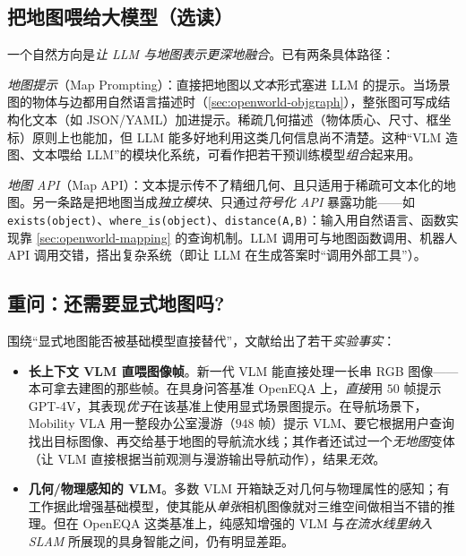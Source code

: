 \subsection{把地图喂给大模型（选读）}
\label{sec:openworld-mapapi}

一个自然方向是\emph{让 LLM 与地图表示更深地融合}\cite{paull2026openworld}。已有两条具体路径：

\emph{地图提示}（Map Prompting）：直接把地图以\emph{文本}形式塞进 LLM 的提示。当场景图的物体与边都用自然语言描述时（\cref{sec:openworld-objgraph}），整张图可写成结构化文本（如 JSON/YAML）加进提示。稀疏几何描述（物体质心、尺寸、框坐标）原则上也能加，但 LLM 能多好地利用这类几何信息尚不清楚。这种“VLM 造图、文本喂给 LLM”的模块化系统，可看作把若干预训练模型\emph{组合}起来用。

\emph{地图 API}（Map API）：文本提示传不了精细几何、且只适用于稀疏可文本化的地图。另一条路是把地图当成\emph{独立模块}、只通过\emph{符号化 API} 暴露功能——如 \texttt{exists(object)}、\texttt{where\_is(object)}、\texttt{distance(A,B)}：输入用自然语言、函数实现靠 \cref{sec:openworld-mapping} 的查询机制。LLM 调用可与地图函数调用、机器人 API 调用交错，搭出复杂系统（即让 LLM 在生成答案时“调用外部工具”）。

\subsection{重问：还需要显式地图吗?}
\label{sec:openworld-needmap}

围绕“显式地图能否被基础模型直接替代”，文献给出了若干\emph{实验事实}：

\begin{itemize}
  \item \textbf{长上下文 VLM 直喂图像帧}。新一代 VLM 能直接处理一长串 RGB 图像——本可拿去建图的那些帧。在具身问答基准 OpenEQA 上，\emph{直接}用 $50$ 帧提示 GPT-4V，其表现\emph{优于}在该基准上使用显式场景图提示\cite{paull2026openworld}。在导航场景下，Mobility VLA 用一整段办公室漫游（$948$ 帧）提示 VLM、要它根据用户查询找出目标图像、再交给基于地图的导航流水线；其作者还试过一个\emph{无地图}变体（让 VLM 直接根据当前观测与漫游输出导航动作），结果\emph{无效}\cite{paull2026openworld}。
  \item \textbf{几何/物理感知的 VLM}。多数 VLM 开箱缺乏对几何与物理属性的感知；有工作据此增强基础模型，使其能从\emph{单张}相机图像就对三维空间做相当不错的推理。但在 OpenEQA 这类基准上，纯感知增强的 VLM 与\emph{在流水线里纳入 SLAM} 所展现的具身智能之间，仍有明显差距\cite{paull2026openworld}。
\end{itemize}

